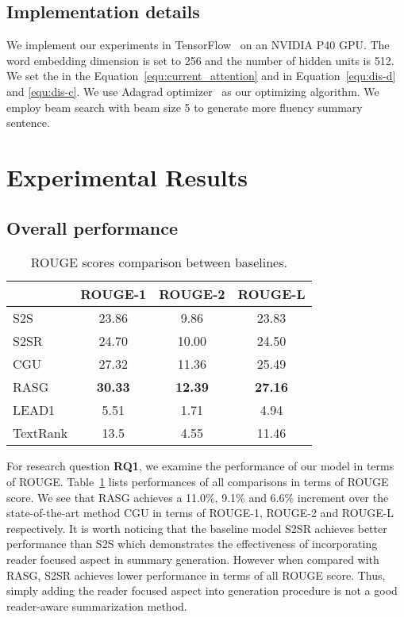 \documentclass[letterpaper]{article} \usepackage{aaai19}  \usepackage{times}  \usepackage{helvet}  \usepackage{courier}
\newcommand{\dubbelop}{}
\begin{document}
\subsection{Implementation details}

We implement our experiments in TensorFlow~\cite{abadi2016tensorflow} on an NVIDIA P40 GPU. 
The word embedding dimension is set to 256 and the number of hidden units is 512.
We set the  in the Equation~\ref{equ:current_attention} and  in Equation~\ref{equ:dis-d} and \ref{equ:dis-c}.
We use Adagrad optimizer~\cite{Duchi2010AdaptiveSM} as our optimizing algorithm.
We employ beam search with beam size 5 to generate more fluency summary sentence.

\section{Experimental Results}

\subsection{Overall performance}

\newcommand{\cbkgrnd}{\cellcolor{blue!15}}
\newcommand{\phantomtriangle}{\phantom{\dubbelop}}
\begin{table}[t]
\centering
\small
\caption{ROUGE scores comparison between baselines.}
\begin{tabular}{@{}l ccc @{}}
\toprule
& ROUGE-1 & ROUGE-2 & ROUGE-L \\
\midrule
S2S &  23.86 & 9.86 & 23.83 \\
S2SR &  24.70 & 10.00 & 24.50 \\
CGU & 27.32 & 11.36 & 25.49  \\
RASG & \textbf{30.33} & \textbf{12.39} & \textbf{27.16} \\
\midrule
LEAD1 & 5.51 & 1.71 & 4.94 \\
TextRank & 13.5 & 4.55 & 11.46 \\
\bottomrule
\end{tabular}
\label{tab:comp_rouge_baselines}
\end{table}

For research question \textbf{RQ1}, we examine the performance of our model in terms of ROUGE. 
Table~\ref{tab:comp_rouge_baselines} lists performances of all comparisons in terms of ROUGE score.
We see that RASG achieves a 11.0\%, 9.1\% and 6.6\% increment over the state-of-the-art method CGU in terms of ROUGE-1, ROUGE-2 and ROUGE-L respectively.
It is worth noticing that the baseline model S2SR achieves better performance than S2S which demonstrates the effectiveness of incorporating reader focused aspect in summary generation.
However when compared with RASG, S2SR achieves lower performance in terms of all ROUGE score.
Thus, simply adding the reader focused aspect into generation procedure is not a good reader-aware summarization method.
\end{document}
